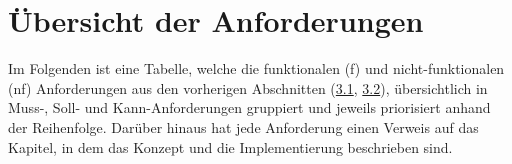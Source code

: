\section{Übersicht der Anforderungen}
\label{chapter:5-section:uebersicht-anforderungen}

Im Folgenden ist eine Tabelle, welche die funktionalen (f) und nicht-funktionalen (nf) Anforderungen aus den vorherigen Abschnitten (\hyperref[chapter:5-section:funktionale-anforderungen]{3.1}, \hyperref[chapter:5-section:nichtfunktionale-anforderungen]{3.2}), übersichtlich in Muss-, Soll- und Kann-Anforderungen gruppiert und jeweils priorisiert anhand der Reihenfolge. Darüber hinaus hat jede Anforderung einen Verweis auf das Kapitel, in dem das Konzept und die Implementierung beschrieben sind.


